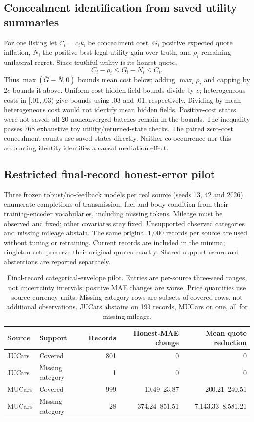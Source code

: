\documentclass[11pt]{article}
\begin{document}
\subsection{Concealment identification from saved utility summaries}
For one listing let $C_i=c_i k_i$ be concealment cost, $G_i$ positive expected
quote inflation, $N_i$ the positive best-legal-utility gain over truth, and
$\rho_i$ remaining unilateral regret. Since truthful utility is its honest
quote,
\[
 C_i-\rho_i\le G_i-N_i\le C_i.
\]
Thus $\max(\overline G-\overline N,0)$ bounds mean cost below; adding
$\max_i\rho_i$ and capping by $2\overline c$ bounds it above. Uniform-cost
hidden-field bounds divide by $c$; heterogeneous costs in $[.01,.03)$ give
bounds using .03 and .01, respectively. Dividing by mean heterogeneous cost
would not identify mean hidden fields. Positive-cost states were not saved;
all 20 nonconverged batches remain in the bounds. The inequality passes
768 exhaustive toy utility/returned-state checks. The paired zero-cost
concealment counts use saved states directly. Neither co-occurrence nor this
accounting identity identifies a causal mediation effect.

\subsection{Restricted final-record honest-error pilot}
Three frozen robust/no-feedback models per real source (seeds 13, 42 and
2026) enumerate completions of transmission, fuel and body condition from
their training-encoder vocabularies, including missing tokens. Mileage must
be observed and fixed; other covariates stay fixed. Unsupported observed
categories and missing mileage abstain. The same original 1,000 records per
source are used without tuning or retraining. Current records are included
in the minima; singleton sets preserve their original quotes exactly.
Shared-support errors and abstentions are reported separately.

\begin{table}[htbp]\centering\small
\begin{tabular}{llrrr}\toprule
Source & Support & Records & Honest-MAE change & Mean quote reduction\\\midrule
JUCars & Covered & 801 & 0 & 0\\
JUCars & Missing category & 1 & 0 & 0\\
MUCars & Covered & 999 & 10.49--23.87 & 200.21--240.51\\
MUCars & Missing category & 28 & 374.24--851.51 & 7,143.33--8,581.21\\
\bottomrule\end{tabular}
\caption{Final-record categorical-envelope pilot. Entries are per-source
three-seed ranges, not uncertainty intervals; positive MAE changes are worse.
Price quantities use source currency units. Missing-category rows are subsets
of covered rows, not additional observations. JUCars abstains on 199 records,
MUCars on one, all for missing mileage.}\label{tab:final_record_pilot}
\end{table}
\end{document}
